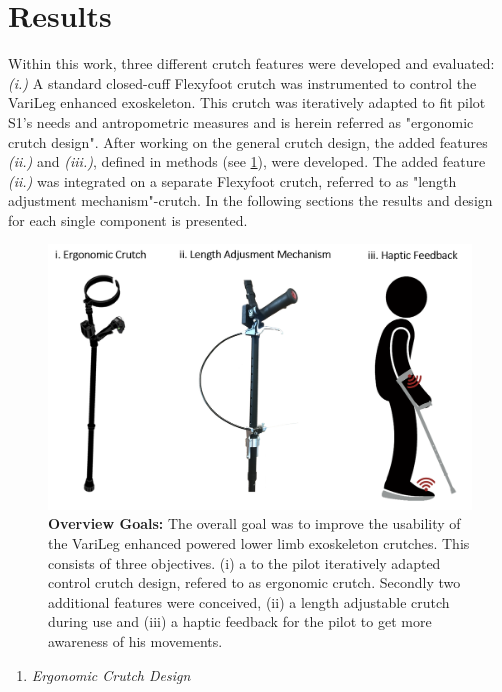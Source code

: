 \documentclass[conference,a4paper]{IEEEtran}
\begin{document}
\section{Results}
Within this work, three different crutch features were developed and evaluated: \textit{(i.)} A standard closed-cuff Flexyfoot crutch was instrumented to control the VariLeg enhanced exoskeleton. This crutch was iteratively adapted to fit pilot S1's needs and antropometric measures and is herein referred as "ergonomic  crutch design". After working on the general crutch design, the added features \textit{(ii.)} and \textit{(iii.)}, defined in methods (see \ref{threegoals}), were developed. The added feature \textit{(ii.)} was integrated on a separate Flexyfoot crutch, referred to as "length adjustment mechanism"-crutch. In the following sections the results and design for each single component is presented. 
\\

\begin{figure}[!t]
	\centering
	\includegraphics[width=0.75\columnwidth]{Images/Results/overview_goals.PNG}
	\caption{\textbf{Overview Goals:} The overall goal was to improve the usability of the VariLeg enhanced powered lower limb exoskeleton crutches. This consists of three objectives. (i) a to the pilot iteratively adapted control crutch design, refered to as ergonomic crutch. Secondly two additional features were conceived, (ii) a length adjustable crutch during use and (iii) a haptic feedback for the pilot to get more awareness of his movements.}
	\label{threegoals}
\end{figure}

\begin{enumerate}[\textit{i.}]
\item{\textit{Ergonomic Crutch Design}}
\end{enumerate}
\end{document}
